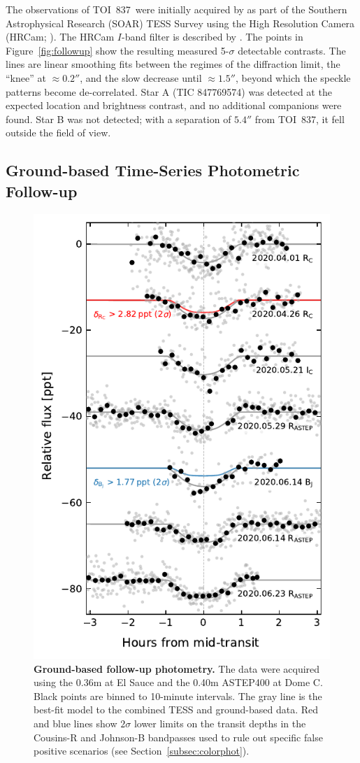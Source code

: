 \documentclass[12pt,twocolumn,tighten]{aastex63}
\newcommand{\tn}{TOI~837} %
\begin{document}
The observations of \tn\ were initially acquired by
\citet{ziegler_soar_2020} as part of the Southern Astrophysical
Research (SOAR) TESS Survey using the High Resolution Camera (HRCam;
\citealt{tokovinin_ten_2018}).  The HRCam $I$-band filter is described
by \citet{tokovinin_ten_2018}.  The points in
Figure~\ref{fig:followup} show the resulting measured 5-$\sigma$
detectable contrasts.  The lines are linear smoothing fits between the
regimes of the diffraction limit, the ``knee'' at $\approx 0.2''$, and
the slow decrease until $\approx 1.5''$, beyond which the speckle
patterns become de-correlated.  Star A (TIC 847769574) was detected at
the expected location and brightness contrast, and no additional
companions were found.  Star B was not detected; with a separation of
$5.4''$ from \tn, it fell outside the field of view.



\subsection{Ground-based Time-Series Photometric Follow-up}
\label{subsec:groundphot}

\begin{figure}[!t]
	\begin{center}
		\leavevmode
		\includegraphics[width=.49\textwidth]{f2b.pdf}
	\end{center}
	\vspace{-0.7cm}
	\caption{
    {\bf Ground-based follow-up photometry.} The data were acquired
    using the 0.36m at El Sauce and the 0.40m ASTEP400 at Dome C.
    Black points are binned to 10-minute intervals.  The gray line is
    the best-fit model to the combined TESS and ground-based data.
    Red and blue lines show $2\sigma$ lower limits on the transit depths in the
    Cousins-R and Johnson-B bandpasses used to rule out specific false
    positive scenarios (see Section~\ref{subsec:colorphot}).
		\label{fig:groundphot}
	}
\end{figure}
\end{document}
